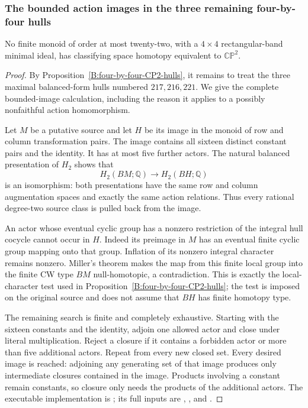 \subsubsection{The bounded action images in the three remaining four-by-four hulls}

\begin{proposition}\label{B:four-by-four-bounded22}
No finite monoid of order at most twenty-two, with a
$4\times4$ rectangular-band minimal ideal, has classifying
space homotopy equivalent to $\mathbb{CP}^2$.
\end{proposition}
\begin{proof}
By Proposition~\ref{B:four-by-four-CP2-hulls}, it remains to treat
the three maximal balanced-form hulls numbered $217,216,221$.
We give the complete bounded-image calculation, including the
reason it applies to a possibly nonfaithful action homomorphism.

Let $M$ be a putative source and let $H$ be its image in the
monoid of row and column transformation pairs.  The image
contains all sixteen distinct constant pairs and the identity.
It has at most five further actors.  The natural balanced
presentation of $H_2$ shows that
\[
 H_2(BM;\mathbb Q)\longrightarrow H_2(BH;\mathbb Q)
\]
is an isomorphism: both presentations have the same row and
column augmentation spaces and exactly the same action
relations.  Thus every rational degree-two source class is
pulled back from the image.

An actor whose eventual cyclic group has a nonzero restriction
of the integral hull cocycle cannot occur in $H$.  Indeed its
preimage in $M$ has an eventual finite cyclic group mapping
onto that group.  Inflation of its nonzero integral character
remains nonzero.  Miller's theorem makes the map from this
finite local group into the finite CW type $BM$ null-homotopic,
a contradiction.  This is exactly the local-character test used
in Proposition~\ref{B:four-by-four-CP2-hulls}; the test is imposed
on the original source and does not assume that $BH$ has
finite homotopy type.

The remaining search is finite and completely exhaustive.
Starting with the sixteen constants and the identity, adjoin
one allowed actor and close under literal multiplication.
Reject a closure if it contains a forbidden actor or more than
five additional actors.  Repeat from every new closed set.
Every desired image is reached: adjoining any generating set
of that image produces only intermediate closures contained
in the image.  Products involving a constant remain constants,
so closure only needs the products of the additional actors.
The executable implementation is
; its full inputs are
,
, and
.


\end{proof}
